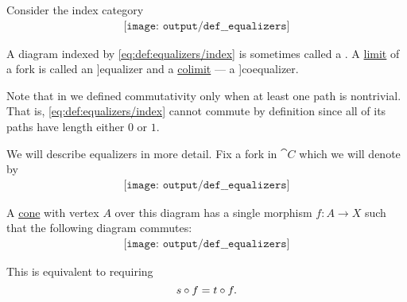 \begin{definition}\label{def:equalizers}
  Consider the index category
  \begin{equation}\label{eq:def:equalizers/index}
    \begin{aligned}
      \texttt{[image: output/def\_\_equalizers]}
    \end{aligned}
  \end{equation}

  A diagram indexed by \eqref{eq:def:equalizers/index} is sometimes called a . A \hyperref[def:category_of_cones/limit]{limit} of a fork is called an \term[ru=уравнитель \cite[36]{ЦаленкоШульгейфер1974}]{equalizer} and a \hyperref[def:category_of_cones/colimit]{colimit} --- a \term[ru=коуравнитель \cite[37]{ЦаленкоШульгейфер1974}]{coequalizer}.

  Note that in  we defined commutativity only when at least one path is nontrivial. That is, \eqref{eq:def:equalizers/index} cannot commute by definition since all of its paths have length either \( 0 \) or \( 1 \).

  We will describe equalizers in more detail. Fix a fork in \( \cat{C} \) which we will denote by
  \begin{equation}\label{eq:def:equalizers/raw_diagram}
    \begin{aligned}
      \texttt{[image: output/def\_\_equalizers]}
    \end{aligned}
  \end{equation}

  \begin{minipage}[t]{0.47\textwidth}
    A \hyperref[def:category_of_cones/cone]{cone} with vertex \( A \) over this diagram has a single morphism \( f: A \to X \) such that the following diagram commutes:
    \begin{equation}\label{eq:def:equalizers/cone}
      \begin{aligned}
        \texttt{[image: output/def\_\_equalizers]}
      \end{aligned}
    \end{equation}

    This is equivalent to requiring
    \begin{equation*}
      s \bincirc f = t \bincirc f.
    \end{equation*}


\end{minipage}
\end{definition}
